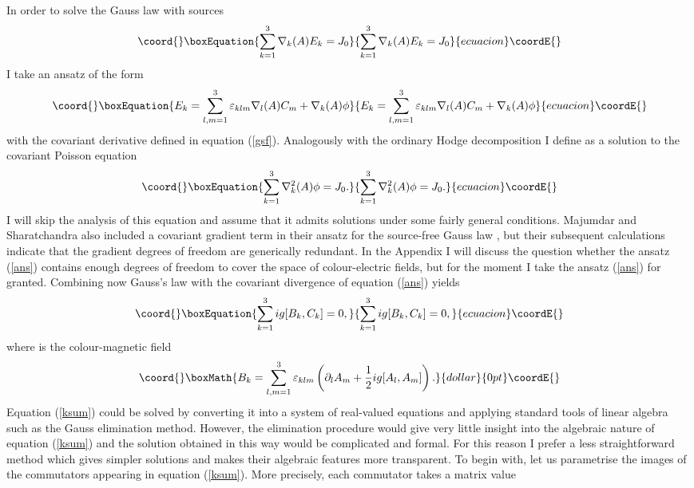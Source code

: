 \documentclass[a4paper,12pt]{article}
\begin{document}
In order to solve the Gauss law with sources
\begin{equation}\coord{}\boxEquation{\label{gauss}
\sum_{k=1}^3 \nabla_k(A) E_k = J_0
}{\sum_{k=1}^3 \nabla_k(A) E_k = J_0
}{ecuacion}\coordE{}\end{equation}
I take an ansatz of the form
\begin{equation}\coord{}\boxEquation{\label{ans}
E_k = \sum_{l,m=1}^3 \varepsilon_{klm} \nabla_l(A) C_m + \nabla_k(A) \phi
}{E_k = \sum_{l,m=1}^3 \varepsilon_{klm} \nabla_l(A) C_m + \nabla_k(A) \phi
}{ecuacion}\coordE{}\end{equation}
with the covariant derivative \coordHE{} defined in equation (\ref{gsf}). Analogously with the ordinary Hodge decomposition I define \myHighlight{$\phi$}\coordHE{} as a solution to the covariant Poisson equation
\begin{equation}\coord{}\boxEquation{ \label{pois}
\sum_{k=1}^3 \nabla_k^2(A) \phi = J_0. 
}{ \sum_{k=1}^3 \nabla_k^2(A) \phi = J_0. 
}{ecuacion}\coordE{}\end{equation}
I will skip the analysis of this equation and assume that it admits solutions under some fairly general conditions. Majumdar and Sharatchandra also included a covariant gradient term in their ansatz for the source-free Gauss law \cite{ms1}, but their subsequent calculations \cite{ms2} indicate that the gradient degrees of freedom are generically redundant. In the Appendix I will discuss the question whether the ansatz (\ref{ans}) contains enough degrees of freedom to cover the space of colour-electric fields, but for the moment I take the ansatz (\ref{ans}) for granted. Combining now Gauss's law with the covariant divergence of equation (\ref{ans}) yields
\begin{equation}\coord{}\boxEquation{
\sum_{k=1}^3 ig [B_k,C_k] = 0, \label{ksum}
}{
\sum_{k=1}^3 ig [B_k,C_k] = 0, }{ecuacion}\coordE{}\end{equation}
where \coordHE{} is the colour-magnetic field
$$\coord{}\boxMath{ B_k = \sum_{l,m=1}^3 \varepsilon_{klm} \left( \partial_l A_m + \frac{1}{2} ig
[A_l,A_m] \right). }{dollar}{0pt}\coordE{}$$
Equation (\ref{ksum}) could be solved by converting it into a system of real-valued equations and applying standard tools of linear algebra such as the Gauss elimination method. However, the  elimination procedure would give very little insight into the algebraic nature of equation (\ref{ksum}) and the solution obtained in this way would be complicated and formal. For this reason I prefer a less straightforward method which gives simpler solutions and makes their algebraic features more transparent. To begin with, let us parametrise the images of the commutators appearing in equation (\ref{ksum}). More precisely, each commutator takes a matrix value
\end{document}

